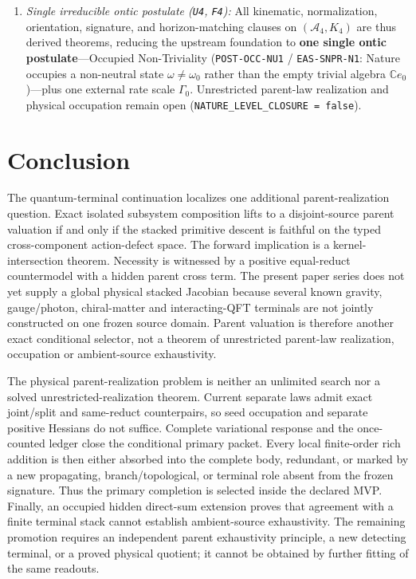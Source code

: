 \documentclass[11pt]{article}
\begin{document}
\begin{enumerate}
\item \emph{Single irreducible ontic postulate (\texttt{U4}, \texttt{F4}):} All kinematic, normalization, orientation, signature, and horizon-matching clauses on $(\mathcal{A}_4,K_4)$ are thus derived theorems, reducing the upstream foundation to \textbf{one single ontic postulate}---Occupied Non-Triviality (\texttt{POST-OCC-NU1} / \texttt{EAS-SNPR-N1}: Nature occupies a non-neutral state $\omega\neq\omega_0$ rather than the empty trivial algebra $\mathbb{C}e_0$)---plus one external rate scale $\Gamma_0$. Unrestricted parent-law realization and physical occupation remain open (\texttt{NATURE\_LEVEL\_CLOSURE = false}).
\end{enumerate}

\section{Conclusion}

The quantum-terminal continuation localizes one additional
parent-realization question. Exact isolated subsystem composition lifts to a disjoint-source
parent valuation if and only if the stacked primitive descent is faithful on
the typed cross-component action-defect space. The forward implication is a
kernel-intersection theorem. Necessity is witnessed by a positive equal-reduct
countermodel with a hidden parent cross term. The present paper series does
not yet supply a global physical stacked Jacobian because several known
gravity, gauge/photon, chiral-matter and interacting-QFT terminals are not
jointly constructed on one frozen source domain. Parent valuation is therefore
another exact conditional selector, not a theorem of unrestricted parent-law
realization, occupation or ambient-source exhaustivity.

The physical parent-realization problem is neither an unlimited search nor a
solved unrestricted-realization theorem. Current separate laws admit exact joint/split and
same-reduct counterpairs, so seed occupation and separate positive Hessians do
not suffice. Complete variational response and the once-counted ledger close
the conditional primary packet. Every local finite-order rich addition is
then either absorbed into the complete body, redundant, or marked by a new
propagating, branch/topological, or terminal role absent from the frozen
signature. Thus the primary completion is selected inside the declared MVP.
Finally, an occupied hidden direct-sum extension proves that agreement with a
finite terminal stack cannot establish ambient-source exhaustivity. The
remaining promotion requires an independent parent exhaustivity principle, a
new detecting terminal, or a proved physical quotient; it cannot be obtained
by further fitting of the same readouts.
\end{document}
